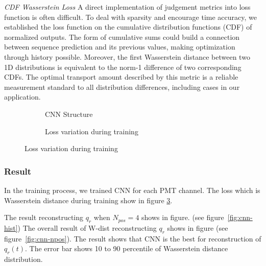\emph{CDF Wasserstein Loss}
A direct implementation of judgement metrics into loss function is often difficult. To deal with sparsity and encourage time accuracy, we established the loss function on the cumulative distribution functions (CDF) of normalized outputs. The form of cumulative sums could build a connection between sequence prediction and its previous values, making optimization through history possible. Moreover, the first Wasserstein distance between two 1D distributions is equivalent to the norm-1 difference of two corresponding CDFs. The optimal transport amount described by this metric is a reliable measurement standard to all distribution differences, including cases in our application.

\begin{figure}[H]
\begin{minipage}[b]{.4\textwidth}
\begin{figure}[H]
    \begin{center}
    \begin{adjustbox}{width=0.6\textwidth}
        
    \end{adjustbox}
    \end{center}
    \caption{\label{fig:struct} CNN Structure}
\end{figure}
\end{minipage}
\begin{minipage}[b]{.6\textwidth}
\begin{figure}[H]
    \centering
    \resizebox{\textwidth}{!}{}
    \caption{\label{fig:loss} Loss variation during training}
\end{figure}
\end{minipage}
\end{figure}

\subsubsection{Result}
In the training process, we trained CNN for each PMT channel. The loss which is Wasserstein distance during training show in figure \ref{fig:loss}. 

The result reconstructing $q_{r}$ when $N_{pos}=4$ shows in figure. (see figure~\ref{fig:cnn-hist}) The overall result of W-dist reconstructing $q_{r}$ shows in figure (see figure~\ref{fig:cnn-npos}). The result shows that CNN is the best for reconstruction of $q_{r}(t)$. The error bar shows 10 to 90 percentile of Wasserstein distance distribution. 


